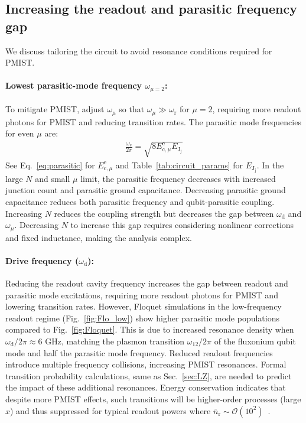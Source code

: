 \documentclass[%
reprint,
superscriptaddress,
 amsmath,amssymb,
 aps,
 prx,
longbibliography,
floatfix,
]{revtex4-2}
\begin{document}
\subsection{Increasing the readout and parasitic frequency gap}\label{mode-frequencies}

We discuss tailoring the circuit to avoid resonance conditions required for PMIST.

\paragraph{Lowest parasitic-mode frequency $\omega_{\mu=2}$:}
To mitigate PMIST, adjust $\omega_\mu$ so that $\omega_\mu \gg \omega_\textrm{r}$ for $\mu=2$, requiring more readout photons for PMIST and reducing transition rates. The parasitic mode frequencies for even $\mu$ are:
\begin{align}
    \frac{\omega_\textrm{e}}{2\pi}=\sqrt{8E_{\textrm{c},\mu}^\textrm{e} E_{\textrm{J}_\textrm{j}}}
\end{align}
See Eq.~\ref{eq:parasitic} for $E_{\textrm{c},\mu}^\textrm{e}$ and Table~\ref{tab:circuit_params} for $E_{\textrm{J}_\textrm{j}}$. In the large $N$ and small $\mu$ limit, the parasitic frequency decreases with increased junction count and parasitic ground capacitance. Decreasing parasitic ground capacitance reduces both parasitic frequency and qubit-parasitic coupling. Increasing $N$ reduces the coupling strength but decreases the gap between $\omega_\textrm{d}$ and $\omega_\mu$. Decreasing $N$ to increase this gap requires considering nonlinear corrections~\cite{viola2015collective} and fixed inductance, making the analysis complex.

\paragraph{Drive frequency ($\omega_\textrm{d}$):}
Reducing the readout cavity frequency increases the gap between readout and parasitic mode excitations, requiring more readout photons for PMIST and lowering transition rates. However, Floquet simulations in the low-frequency readout regime (Fig.~\ref{fig:Flo_low}) show higher parasitic mode populations compared to Fig.~\ref{fig:Floquet}. This is due to increased resonance density when $\omega_\textrm{d}/2\pi \approx 6$ GHz, matching the plasmon transition $\omega_{12}/2\pi$ of the fluxonium qubit mode and half the parasitic mode frequency. Reduced readout frequencies introduce multiple frequency collisions, increasing PMIST resonances. Formal transition probability calculations, same as Sec.~\ref{sec:LZ}, are needed to predict the impact of these additional resonances. Energy conservation indicates that despite more PMIST effects, such transitions will be higher-order processes (large $x$) and thus suppressed for typical readout powers where $\bar n_\textrm{r}\sim \mathcal{O}(10^2)$~\cite{gusenkova2021quantum}.
\end{document}
